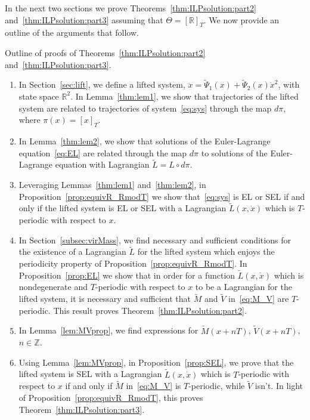 In the next two sections we prove Theorems~\ref{thm:ILPsolution:part2}
and~\ref{thm:ILPsolution:part3} assuming that $\Theta = [\mathbb{R}]_T$.  We
now provide an outline of the arguments that follow.

{\sc Outline of proofs of Theorems~\ref{thm:ILPsolution:part2}
	and~\ref{thm:ILPsolution:part3}.}

\begin{enumerate}[Step 1] \itemsep1pt \parskip0pt 
	
	\item In Section~\ref{sec:lift}, we define a lifted system, $\ddot x =
	\tilde \Psi_1(x) + \tilde \Psi_2(x) \dot x^2$, with state space
	$\mathbb{R}^2$. In Lemma~\ref{thm:lem1}, we show that trajectories of the
	lifted system are related to trajectories of system~\eqref{eq:sys}
	through the map $d \pi$, where $\pi(x) = [x]_T$.
	
	\item In Lemma~\ref{thm:lem2}, we show that solutions of the
	Euler-Lagrange equation~\eqref{eq:EL} are related through the map $d
	\pi$ to solutions of the Euler-Lagrange equation with Lagrangian
	$\tilde L = L \circ d \pi$.
	
	\item
	
	
	
	
	Leveraging Lemmas~\ref{thm:lem1} and~\ref{thm:lem2}, in
	Proposition~\ref{prop:equivR_RmodT} we show that~\eqref{eq:sys} is
	EL or SEL if and only if the lifted system is EL or SEL with
	a Lagrangian $\tilde L(x,\dot x)$ which is $T$-periodic with respect to $x$.
	
	\item In Section~\ref{subsec:virMass}, we find necessary and
	sufficient conditions for the existence of a Lagrangian $\tilde L$
	for the lifted system which enjoys the periodicity property of
	Proposition~\ref{prop:equivR_RmodT}. In Proposition~\ref{prop:EL} we
	show that in order for a function $\tilde L(x,\dot x)$ which is
	nondegenerate and $T$-periodic with respect to $x$ to be a
	Lagrangian for the lifted system, it is necessary and sufficient
	that $\tilde M$ and $\tilde V$ in~\eqref{eq:M_V} are
	$T$-periodic. This result proves
	Theorem~\ref{thm:ILPsolution:part2}.
	
	\item In Lemma~\ref{lem:MVprop}, we find expressions for $\tilde
	M(x + n T)$, $\tilde V(x + n T)$, $n \in \mathbb{Z}$.
	
	\item Using Lemma~\ref{lem:MVprop}, in Proposition~\ref{prop:SEL}, we
	prove that the lifted system is SEL with a Lagrangian $\tilde
	L(x,\dot x)$ which is $T$-periodic with respect to $x$ if and only
	if $\tilde M$ in~\eqref{eq:M_V} is $T$-periodic, while $\tilde V$
	isn't. In light of Proposition~\ref{prop:equivR_RmodT}, this proves
	Theorem~\ref{thm:ILPsolution:part3}.
	
	
	
	
	
	
	
	
	
	
	
	
\end{enumerate}

